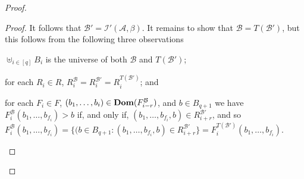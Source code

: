 \documentclass[../main/thesis.tex]{subfiles}
\begin{document}
\begin{proof}
\begin{proof}

    It follows that $\mathcal{B}' = \mathcal{I}'(\mathcal{A}, \beta)$. It
    remains to show that $\mathcal{B} = T(\mathcal{B}')$, but this follows from
    the following three observations
    \begin{myitemize}
    \item $\uplus_{i \in [q]} B_i$ is the universe of both $\mathcal{B}$ and
      $T(\mathcal{B}')$;
    \item for each $R_i \in R$, $R^{\mathcal{B}}_i = R^{\mathcal{B}'}_i =
      R^{T(\mathcal{B}')}_i$; and
    \item for each $F_i \in F$, $(b_1, \ldots, b_{i}) \in \text{\textbf{Dom}}
      (F^{\mathcal{B}}_{i - r})$, and $b \in B_{q+1}$ we have
      $F^{\mathcal{B}}_i(b_1, \ldots, b_{f_i}) > b$ if, and only if, $(b_1,
      \ldots, b_{f_{i}}, b) \in R^{\mathcal{B}'}_{i + r}$, and so
      $F^{\mathcal{B}}_i(b_1, \ldots, b_{f_i}) = \{(b \in B_{q+ 1} : (b_1,
      \ldots, b_{f_{i}}, b) \in R^{\mathcal{B}'}_{i + r}\} =
      F^{T(\mathcal{B}')}_i(b_1, \ldots, b_{f_i})$.
    \end{myitemize}
  \end{proof}
  

\end{proof}
\end{document}
